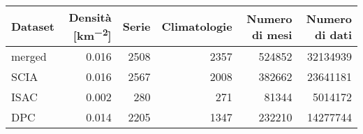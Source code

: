 
\begin{tabular}{lrrrrr}
  \toprule
  Dataset & Densità [\unit{\kilo\meter^{-2}}] & Serie & Climatologie\tnote{*} \tnote{1} & Numero di mesi\tnote{*} \tnote{2} & Numero di dati\tnote{*} \tnote{3}\\
  \midrule
  merged & 0.016 & 2508 & 2357 & 524852 & 32134939\\
  SCIA & 0.016 & 2567 & 2008 & 382662 & 23641181\\
  ISAC & 0.002 & 280 & 271 & 81344 & 5014172\\
  DPC & 0.014 & 2205 & 1347 & 232210 & 14277744\\
  \bottomrule
\end{tabular}
